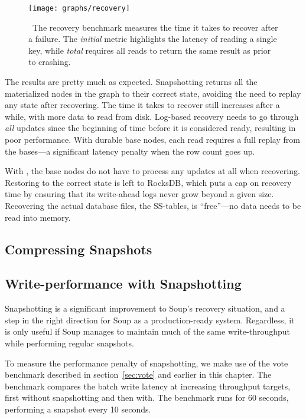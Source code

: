 \begin{figure}[H]
  \centering
  \texttt{[image: graphs/recovery]}
  \caption{\
    The recovery benchmark measures the time it takes to recover after
    a failure. The \textit{initial} metric highlights the latency of reading a
    single key, while \textit{total} requires all reads to return the same
    result as prior to crashing.
  }\label{fig:graph-recovery}
\end{figure}

The results are pretty much as expected. Snapshotting returns all the
materialized nodes in the graph to their correct state, avoiding the need to
replay any state after recovering. The time it takes to recover still increases
after a while, with more data to read from disk. Log-based recovery needs to go
through \textit{all} updates since the beginning of time before it is considered
ready, resulting in poor performance. With durable base nodes, each read
requires a full replay from the bases---a significant latency penalty when the
row count goes up.

With , the base nodes do not have to process any updates
at all when recovering. Restoring \code{PersistentState} to the correct state is
left to RocksDB, which puts a cap on recovery time by ensuring that its
write-ahead logs never grow beyond a given size. Recovering the actual database
files, the SS-tables, is ``free''---no data needs to be read into memory.

\subsection{Compressing Snapshots}


\subsection{Write-performance with Snapshotting}

Snapshotting is a significant improvement to Soup's recovery situation, and a
step in the right direction for Soup as a production-ready system. Regardless,
it is only useful if Soup manages to maintain much of the same write-throughput
while performing regular snapshots.

To measure the performance penalty of snapshotting, we make use of the vote
benchmark described in section~\ref{sec:vote} and earlier in this chapter. The
benchmark compares the batch write latency at increasing throughput targets,
first without snapshotting and then with. The benchmark runs for 60 seconds,
performing a snapshot every 10 seconds.

